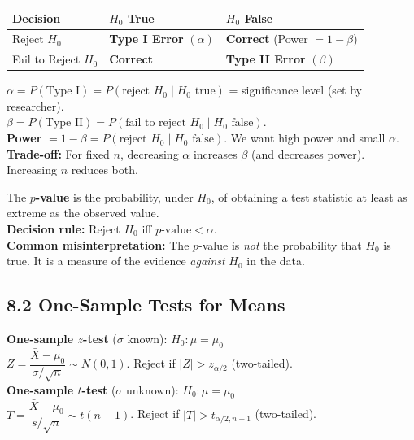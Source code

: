 \documentclass[12pt]{article}
\newcommand{\hcell}[1]{\textbf{\color{white}#1}}
\begin{document}
\begin{defbox}
\begin{center}{\small
\begin{tabular}{|l|C{3.5cm}|C{3.5cm}|}
\hline{}\hcell{Decision}&\hcell{$H_0$ True}&\hcell{$H_0$ False}\\\hline
Reject $H_0$&\textbf{Type I Error} $(\alpha)$&\textbf{Correct} (Power $=1-\beta$)\\\hline
Fail to Reject $H_0$&\textbf{Correct}&\textbf{Type II Error} $(\beta)$\\\hline
\end{tabular}}
\end{center}
$\alpha=P(\text{Type I})=P(\text{reject }H_0\mid H_0\text{ true})$ = significance level (set by researcher).\\
$\beta=P(\text{Type II})=P(\text{fail to reject }H_0\mid H_0\text{ false})$.\\
\textbf{Power} $=1-\beta=P(\text{reject }H_0\mid H_0\text{ false})$. We want high power and small $\alpha$.\\[4pt]
\textbf{Trade-off:} For fixed $n$, decreasing $\alpha$ increases $\beta$ (and decreases power). Increasing $n$ reduces both.
\end{defbox}

\begin{defbox}[$p$-value]
The \textbf{$p$-value} is the probability, under $H_0$, of obtaining a test statistic at least as extreme as the observed value.\\[4pt]
\textbf{Decision rule:} Reject $H_0$ iff $p\text{-value}<\alpha$.\\[4pt]
\textbf{Common misinterpretation:} The $p$-value is \textit{not} the probability that $H_0$ is true. It is a measure of the evidence \textit{against} $H_0$ in the data.
\end{defbox}

\subsection{8.2 One-Sample Tests for Means}

\begin{formulabox}
\textbf{One-sample $z$-test} ($\sigma$ known): $H_0:\mu=\mu_0$\\
$Z=\dfrac{\bar X-\mu_0}{\sigma/\sqrt n}\sim N(0,1)$. Reject if $|Z|>z_{\alpha/2}$ (two-tailed).\\[8pt]
\textbf{One-sample $t$-test} ($\sigma$ unknown): $H_0:\mu=\mu_0$\\
$T=\dfrac{\bar X-\mu_0}{s/\sqrt n}\sim t(n-1)$. Reject if $|T|>t_{\alpha/2,n-1}$ (two-tailed).
\end{formulabox}
\end{document}
